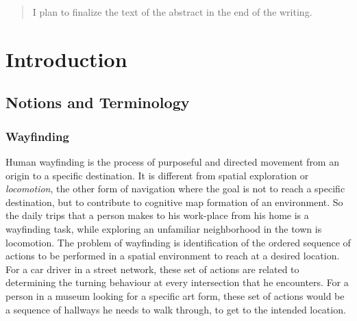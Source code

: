 \documentclass{iitkthesis}
\begin{document}
\author{Arbaz Khan}
\dissertation
\maketitle
\makecertificate
\begin{abstract}
I plan to finalize the text of the abstract in the end of the writing.

\iffalse
  A computational model of understanding place descriptions is a cardinal issue in multiple disciplines and provides critical applications especially in dialog-driven geolocation services. This research targets the automated extraction of spatial triplets to represent qualitative spatial relations between recognized places from natural language place descriptions via a simple class of locative expressions. We attempt to produce triplets, informative and \textit{convenient} enough as a medium to convert verbal descriptions to graph representations of places and their relationships. We present a reasoning approach devoid of any external resources (such as maps, path geometries or robotic vision) for understanding place descriptions. We then apply our methodologies to situated place descriptions and study the results, its errors and implied future research.
\fi
\end{abstract}
\tableofcontents
\chapter{Introduction}
\section{Notions and Terminology}
\subsection{Wayfinding}
Human wayfinding is the process of purposeful and directed movement from an origin to a specific destination. It is different from spatial exploration or \textit{locomotion}, the other form of navigation where the goal is not to reach a specific destination, but to contribute to cognitive map formation of an environment. So the daily trips that a person makes to his work-place from his home is a wayfinding task, while exploring an unfamiliar neighborhood in the town is locomotion. The problem of wayfinding is identification of the ordered sequence of actions to be performed in a spatial environment to reach at a desired location. For a car driver in a street network, these set of actions are related to determining the turning behaviour at every intersection that he encounters. For a person in a museum looking for a specific art form, these set of actions would be a sequence of hallways he needs to walk through, to get to the intended location. 
\end{document}

